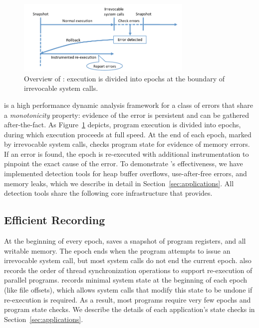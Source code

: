 \label{sec:overview}

\begin{figure}[!t]
\begin{center}
\includegraphics[width=3.3in]{figure/overview}
\end{center}
\caption{
Overview of \doubletake{}: execution is divided into epochs at the boundary of irrevocable system calls. 
\label{fig:overview}}
\end{figure}

\doubletake{} is a high performance dynamic analysis framework for a class of errors that share a \emph{monotonicity} property: evidence of the error is persistent and can be gathered after-the-fact. As Figure~\ref{fig:overview} depicts, program execution is divided into epochs, during which execution proceeds at full speed. At the end of each epoch, marked by irrevocable system calls, \doubletake{} checks program state for evidence of memory errors. If an error is found, the epoch is re-executed with additional instrumentation to pinpoint the exact cause of the error. To demonstrate \doubletake{}'s effectiveness, we have implemented detection tools for heap buffer overflows, use-after-free errors, and memory leaks, which we describe in detail in Section~\ref{sec:applications}.  All detection tools share the following core infrastructure that \doubletake{} provides.

\subsection{Efficient Recording}

At the beginning of every epoch, \doubletake{} saves a snapshot of program registers, and all writable memory. The epoch ends when the program attempts to issue an irrevocable system call, but most system calls do not end the current epoch. \doubletake{} also records the order of thread synchronization operations to support re-execution of parallel programs. \doubletake{} records minimal system state at the beginning of each epoch (like file offsets), which allows system calls that modify this state to be undone if re-execution is required. As a result, most programs require very few epochs and program state checks. We describe the details of each application's state checks in Section~\ref{sec:applications}.

